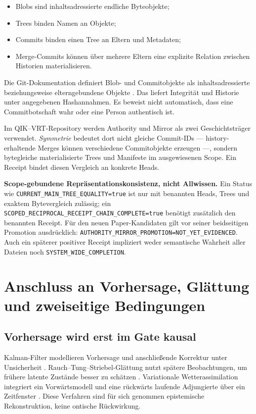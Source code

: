 \documentclass[11pt,a4paper]{article}
\theoremstyle{remark}
\newcommand{\statusbox}[2]{%
  \par\medskip\noindent
  \colorbox{#1}{\parbox{\dimexpr\linewidth-2\fboxsep\relax}{#2}}%
  \par\medskip
}
\begin{document}
\begin{itemize}
  \item Blobs sind inhaltsadressierte endliche Byteobjekte;
  \item Trees binden Namen an Objekte;
  \item Commits binden einen Tree an Eltern und Metadaten;
  \item Merge-Commits können über mehrere Eltern eine explizite Relation
  zwischen Historien materialisieren.
\end{itemize}

Die Git-Dokumentation definiert Blob- und Commitobjekte als
inhaltsadressierte beziehungsweise elterngebundene Objekte
\cite{githashobject,gitcommittree}. Das liefert Integrität und Historie unter
angegebenen Hashannahmen. Es beweist nicht automatisch, dass eine
Commitbotschaft wahr oder eine Person authentisch ist.

Im QIK--VRT-Repository werden Authority und Mirror als zwei
Geschichtsträger verwendet. \emph{Symmetrie} bedeutet dort nicht gleiche
Commit-IDs --- history-erhaltende Merges können verschiedene Commitobjekte
erzeugen ---, sondern bytegleiche materialisierte Trees und Manifeste im
ausgewiesenen Scope. Ein Receipt bindet diesen Vergleich an konkrete Heads.

\statusbox{QAmber}{
\textbf{Scope-gebundene Repräsentationskonsistenz, nicht Allwissen.}
Ein Status wie \texttt{CURRENT\_MAIN\_TREE\_EQUALITY=true} ist nur mit
benannten Heads, Trees und exaktem Bytevergleich zulässig; ein
\texttt{SCOPED\_RECIPROCAL\_RECEIPT\_CHAIN\_COMPLETE=true} benötigt
zusätzlich den benannten Receipt. Für den neuen Paper-Kandidaten gilt vor
seiner beidseitigen Promotion ausdrücklich:
\texttt{AUTHORITY\_MIRROR\_PROMOTION=NOT\_YET\_EVIDENCED}.
Auch ein späterer positiver Receipt impliziert weder semantische Wahrheit
aller Dateien noch \texttt{SYSTEM\_WIDE\_COMPLETION}.
}

\section{Anschluss an Vorhersage, Glättung und zweiseitige Bedingungen}

\subsection{Vorhersage wird erst im Gate kausal}

Kalman-Filter modellieren Vorhersage und anschließende Korrektur unter
Unsicherheit \cite{kalman}. Rauch--Tung--Striebel-Glättung nutzt spätere
Beobachtungen, um frühere latente Zustände besser zu schätzen
\cite{rauch}. Variationale Wetterassimilation integriert ein Vorwärtsmodell
und eine rückwärts laufende Adjungierte über ein Zeitfenster
\cite{talagrand}. Diese Verfahren sind für sich genommen epistemische
Rekonstruktion, keine ontische Rückwirkung.
\end{document}
